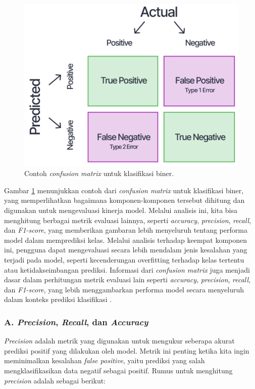 \begin{figure}[H]
  \centering
  \includegraphics[scale=0.7]{gambar/bab2/cf.png}
  \caption{Contoh \emph{confusion matrix} untuk klasifikasi biner.\cite{V7Labs2025}}
  \label{fig:cf}
\end{figure}

Gambar \ref{fig:cf} menunjukkan contoh dari \emph{confusion matrix} untuk klasifikasi biner, yang memperlihatkan bagaimana komponen-komponen tersebut dihitung dan digunakan untuk mengevaluasi kinerja model. Melalui analisis ini, kita bisa menghitung berbagai metrik evaluasi lainnya, seperti \emph{accuracy}, \emph{precision}, \emph{recall}, dan \emph{F1-score}, yang memberikan gambaran lebih menyeluruh tentang performa model dalam memprediksi kelas. Melalui analisis terhadap keempat komponen ini, pengguna dapat mengevaluasi secara lebih mendalam jenis kesalahan yang terjadi pada model, seperti kecenderungan overfitting terhadap kelas tertentu atau ketidakseimbangan prediksi. Informasi dari \emph{confusion matrix} juga menjadi dasar dalam perhitungan metrik evaluasi lain seperti \emph{accuracy}, \emph{precision}, \emph{recall}, dan \emph{F1-score}, yang lebih menggambarkan performa model secara menyeluruh dalam konteks prediksi klasifikasi \cite{V7Labs2025}.

\subsubsection{A. \emph{Precision}, \emph{Recall}, dan \emph{Accuracy}}

\emph{Precision} adalah metrik yang digunakan untuk mengukur seberapa akurat prediksi positif yang dilakukan oleh model. Metrik ini penting ketika kita ingin meminimalkan kesalahan \emph{false positive}, yaitu prediksi yang salah mengklasifikasikan data negatif sebagai positif. Rumus untuk menghitung \emph{precision} adalah sebagai berikut:

